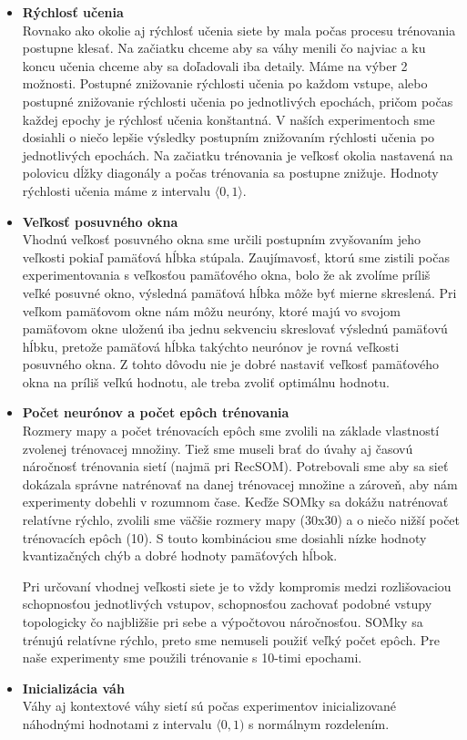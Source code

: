 \begin{itemize}
    \item \textbf{Rýchlosť učenia} \\
    Rovnako ako okolie aj rýchlosť učenia siete by mala počas
procesu trénovania postupne klesať. Na začiatku chceme aby sa váhy menili čo najviac
a ku koncu učenia chceme aby sa doľadovali iba detaily.
Máme na výber 2 možnosti. Postupné znižovanie rýchlosti učenia po každom vstupe, alebo 
postupné znižovanie rýchlosti učenia po jednotlivých epochách, pričom počas každej epochy
je rýchlosť učenia konštantná. 
V naších experimentoch sme dosiahli o niečo lepšie výsledky postupním znižovaním rýchlosti
učenia po jednotlivých epochách. Na začiatku trénovania je veľkosť okolia nastavená na polovicu dĺžky diagonály a počas
trénovania sa postupne znižuje.
Hodnoty rýchlosti učenia máme z intervalu $\langle0, 1\rangle$.
    \item \textbf{Veľkosť posuvného okna} \\
    Vhodnú veľkosť posuvného okna sme určili postupním zvyšovaním jeho veľkosti pokiaľ pamäťová hĺbka stúpala. 
Zaujímavosť, ktorú sme zistili počas experimentovania s veľkosťou pamäťového okna, bolo že 
ak zvolíme príliš veľké posuvné okno, výsledná pamäťová hĺbka môže byť mierne skreslená.
Pri veľkom pamäťovom okne nám môžu neuróny, ktoré majú vo svojom pamäťovom okne uloženú iba 
jednu sekvenciu skreslovať výslednú pamäťovú hĺbku, pretože pamäťová hĺbka takýchto
neurónov je rovná veľkosti posuvného okna. Z tohto dôvodu nie je dobré nastaviť veľkosť pamäťového okna na 
príliš veľkú hodnotu, ale treba zvoliť optimálnu hodnotu.
    \item \textbf{Počet neurónov a počet epôch trénovania} \\
    Rozmery mapy a počet trénovacích epôch sme zvolili na základe vlastností zvolenej trénovacej množiny. 
Tiež sme museli brať do úvahy aj časovú náročnosť trénovania sietí (najmä pri RecSOM).
Potrebovali sme aby sa sieť dokázala správne natrénovať na danej trénovacej množine a zároveň, aby nám experimenty dobehli v rozumnom čase.
Keďže SOMky sa dokážu natrénovať relatívne rýchlo, zvolili sme väčšie rozmery mapy (30x30) a o niečo nižší počet trénovacích epôch (10).
S touto kombináciou sme dosiahli nízke hodnoty kvantizačných chýb a dobré hodnoty pamäťových hĺbok.

Pri určovaní vhodnej veľkosti siete je to vždy kompromis medzi rozlišovaciou schopnosťou jednotlivých vstupov, schopnosťou
zachovať podobné vstupy topologicky čo najbližšie pri sebe a výpočtovou náročnosťou. 
SOMky sa trénujú relatívne rýchlo, preto sme nemuseli použiť veľký počet epôch. Pre naše experimenty sme 
použili trénovanie s 10-timi epochami.
    \item \textbf{Inicializácia váh} \\ 
Váhy aj kontextové váhy sietí sú počas experimentov inicializované náhodnými hodnotami z intervalu $\langle0, 1)$ s normálnym rozdelením.
\end{itemize}


